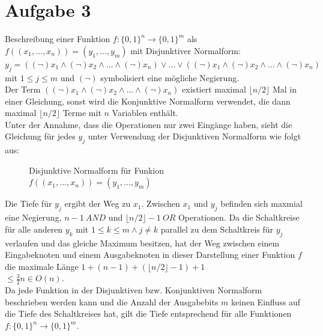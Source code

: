 \documentclass[a4paper]{scrartcl}
\begin{document}
\newpage
\section*{Aufgabe 3}

Beschreibung einer Funktion $f: \{0,1\}^n \rightarrow \{0,1\}^m$ als $f((x_1,...,x_n))=(y_1,...,y_m)$ mit Disjunktiver Normalform:\\
$y_j = ((\neg) x_1 \wedge (\neg) x_2 \wedge ... \wedge (\neg) x_n ) \vee ... \vee ((\neg) x_1 \wedge (\neg) x_2 \wedge ... \wedge (\neg) x_n )$ mit $1\leq j \leq m$ und $(\neg)$ symbolisiert eine mögliche Negierung.\\
Der Term $((\neg) x_1 \wedge (\neg) x_2 \wedge ... \wedge (\neg) x_n )$ existiert maximal $\lfloor n/2 \rfloor$ Mal in einer Gleichung, sonst wird die Konjunktive Normalform verwendet, die dann maximal $\lfloor n/2 \rfloor$ Terme mit $n$ Variablen enthält.\\
Unter der Annahme, dass die Operationen nur zwei Eingänge haben, sieht die Gleichung für jedes $y_j$ unter Verwendung der Disjunktiven Normalform wie folgt aus:
\begin{figure}[htp] 
\caption{Disjunktive Normalform für Funkion $f((x_1,...,x_n))=(y_1,...,y_m)$}
\end{figure}

Die Tiefe für $y_j$ ergibt der Weg zu $x_1$. Zwischen $x_1$ und $y_j$ befinden sich maxmial eine Negierung, $n-1~AND$ und $\lfloor n/2\rfloor -1~OR$ Operationen. Da die Schaltkreise für alle anderen $y_k$ mit $1\leq k\leq m \wedge j\neq k$ parallel zu dem Schaltkreis für $y_j$ verlaufen und das gleiche Maximum besitzen, hat der Weg zwischen einem Eingabeknoten und einem Ausgabeknoten in dieser Darstellung einer Funktion $f$ die maximale Länge $1+(n-1)+(\lfloor n/2\rfloor -1)+1$\\ $\leq \frac{3}{2} n \in O(n)$.\\
Da jede Funktion in der Disjunktiven bzw. Konjunktiven Normalform beschrieben werden kann und die Anzahl der Ausgabebits $m$ keinen Einfluss auf die Tiefe des Schaltkreises hat, gilt die Tiefe entsprechend für alle Funktionen $f: \{0,1\}^n \rightarrow \{0,1\}^m$.
\end{document}
